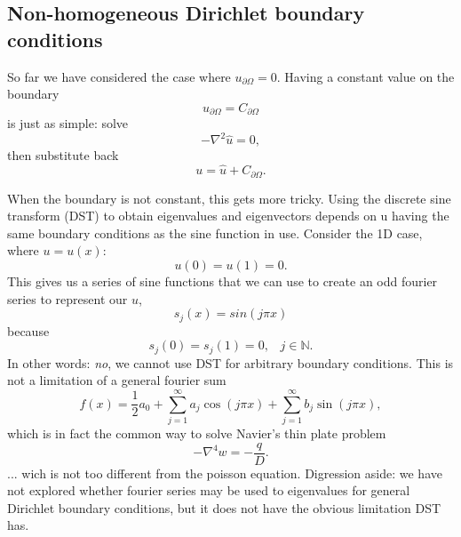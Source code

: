 \subsection{Non-homogeneous Dirichlet boundary conditions}
So far we have considered the case where $u_{\partial \Omega} = 0$. Having a constant value on the boundary
\begin{equation}
  u_{\partial \Omega} = C_{\partial \Omega}
\end{equation}
is just as simple: solve
\begin{equation}
-\nabla^2 \hat{u} = 0,
\end{equation}
then substitute back
\begin{equation}
u = \hat{u} + C_{\partial \Omega}.
\end{equation}

When the boundary is not constant, this gets more tricky. Using the discrete sine transform (DST) to obtain eigenvalues and eigenvectors depends on u having the same boundary conditions as the sine function in use. Consider the 1D case, where $u = u(x)$:
\begin{equation}
	u(0) = u(1) = 0.
\end{equation}
This gives us a series of sine functions that we can use to create an odd fourier series to represent our $u$,
\begin{equation}
	s_j(x) = sin\left(j \pi x\right)
\end{equation}
because
\begin{equation}
	s_j(0) = s_j(1) = 0, \;\;\; j \in \mathbb{N}.
\end{equation}
In other words: \emph{no}, we cannot use DST for arbitrary boundary conditions. This is not a limitation of a general fourier sum
\begin{equation}
	f(x) = \frac{1}{2} a_0
		+ \sum_{j=1}^{\infty} a_j \cos(j \pi x)
		+ \sum_{j=1}^{\infty} b_j \sin(j \pi x)
		,
\end{equation}
which is in fact the common way to solve Navier's thin plate problem
\begin{equation}
-\nabla^4 w = -\frac{q}{D}.
\end{equation}
... wich is not too different from the poisson equation. Digression aside: we have not explored whether fourier series may be used to eigenvalues for general Dirichlet boundary conditions, but it does not have the obvious limitation DST has.
